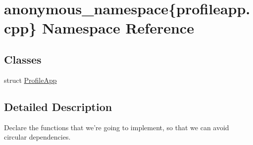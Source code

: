 \hypertarget{namespaceanonymous__namespace_02profileapp_8cpp_03}{\section{anonymous\-\_\-namespace\{profileapp.\-cpp\} Namespace Reference}
\label{namespaceanonymous__namespace_02profileapp_8cpp_03}
}
\subsection*{Classes}
\begin{DoxyCompactItemize}
\item 
struct \hyperlink{structanonymous__namespace_02profileapp_8cpp_03_1_1ProfileApp}{Profile\-App}
\end{DoxyCompactItemize}


\subsection{Detailed Description}
Declare the functions that we're going to implement, so that we can avoid circular dependencies. 
